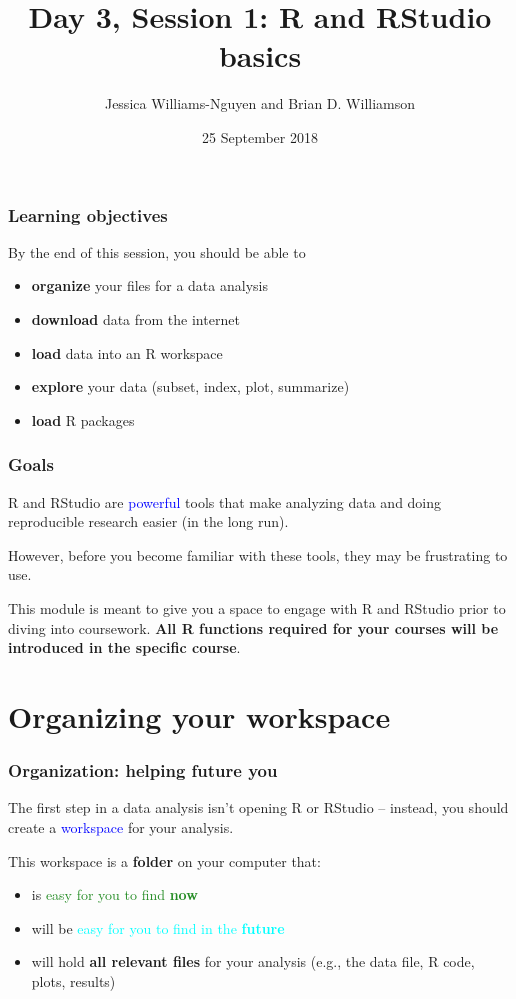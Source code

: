\documentclass[11pt,dvipsnames]{beamer}
\title{Day 3, Session 1: R and RStudio basics}
\author{Jessica Williams-Nguyen and Brian D. Williamson}
\institute{EPI/BIOST Bootcamp 2018}
\date{25 September 2018}
\begin{document}
\begin{frame}
\titlepage
\end{frame}

\begin{frame}
\frametitle{Learning objectives}
By the end of this session, you should be able to
\begin{itemize}
\item \textbf{organize} your files for a data analysis
\item \textbf{download} data from the internet
\item \textbf{load} data into an R workspace
\item \textbf{explore} your data (subset, index, plot, summarize) 
\item \textbf{load} R packages
\end{itemize}
\end{frame}

\begin{frame}
\frametitle{Goals}
R and RStudio are \textcolor{blue}{powerful} tools that make analyzing data and doing reproducible research easier (in the long run). 

However, before you become familiar with these tools, they may be frustrating to use.

\pause
This module is meant to give you a space to engage with R and RStudio prior to diving into coursework. \textbf{All R functions required for your courses will be introduced in the specific course}.
\end{frame}

\section{Organizing your workspace}
\begin{frame}
\frametitle{Organization: helping future you}
The first step in a data analysis isn't opening R or RStudio -- instead, you should create a \textcolor{blue}{workspace} for your analysis. \pause

This workspace is a \textbf{folder} on your computer that: \vspace{-0.3cm}\pause
\begin{itemize}
\item is \textcolor{ForestGreen}{easy for you to find \textbf{now}} \pause
\item will be \textcolor{cyan}{easy for you to find in the \textbf{future}} \pause
\item will hold \textbf{all relevant files} for your analysis (e.g., the data file, R code, plots, results)
\end{itemize}
\end{frame}
\end{document}
